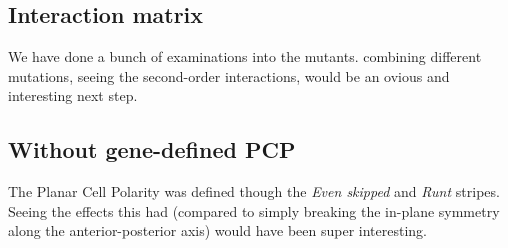 \subsection{Interaction matrix}
We have done a bunch of examinations into the mutants. combining different mutations, seeing the second-order interactions, would be an ovious and interesting next step.

\subsection{Without gene-defined PCP}
The Planar Cell Polarity was defined though the \textit{Even skipped} and \textit{Runt} stripes. Seeing the effects this had (compared to simply breaking the in-plane symmetry along the anterior-posterior axis) would have been super interesting.

